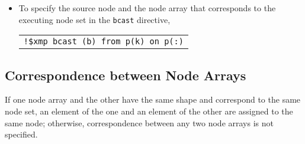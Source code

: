 \begin{itemize}
\item To specify the source node and the node array that corresponds to
      the executing node set in the {\tt bcast} directive,


\begin{tabular}{l}
\verb|!$xmp bcast (b) from p(k) on p(:)| \\
\end{tabular}
\end{itemize}

%


\subsection{Correspondence between Node Arrays}

If one node array and the other have the same shape and correspond to
the same node set, an element of the one and an element of the other are
assigned to the same node;
%
otherwise, correspondence between any two node arrays is not specified.
